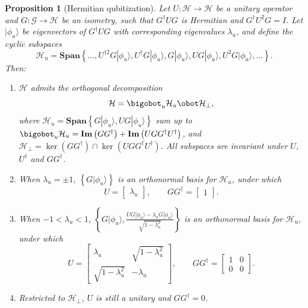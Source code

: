 \documentclass[letterpaper,onecolumn,11pt,accepted=2026-02-14]{quantumarticle}
\newtheorem{proposition}[lemma]{Proposition}
\theoremstyle{remark}
\theoremstyle{plain}
\newcommand{\ket}[1]{|#1\rangle}
\begin{document}
\begin{proposition}[Hermitian qubitization]
\label{prop:qubitization}
Let $U:\mathcal{H}\rightarrow\mathcal{H}$ be a unitary operator and $G:\mathcal{G}\rightarrow\mathcal{H}$ be an isometry, such that $G^\dagger UG$ is Hermitian and $G^\dagger U^2G=I$. Let $\ket{\phi_u}$ be eigenvectors of $G^\dagger UG$ with corresponding eigenvalues $\lambda_u$, and define the cyclic subspaces
\begin{equation}
    \mathcal{H}_u=\mathbf{Span}\left\{\ldots,U^{\dagger2} G\ket{\phi_u},U^\dagger G\ket{\phi_u},G\ket{\phi_u},UG\ket{\phi_u},U^2G\ket{\phi_u},\ldots\right\}.
\end{equation}
Then:
\begin{enumerate}
    \item $\mathcal{H}$ admits the orthogonal decomposition
    \begin{equation}
        \mathcal{H}=\bigobot_{u}\mathcal{H}_u
        \obot\mathcal{H}_\bot,
    \end{equation}
    where $\mathcal{H}_u=\mathbf{Span}\left\{G\ket{\phi_u},UG\ket{\phi_u}\right\}$ sum up to 
    $
    \bigobot_{u}\mathcal{H}_u=\mathbf{Im}\left(GG^\dagger\right)+\mathbf{Im}\left(UGG^\dagger U^\dagger\right)$, and $\mathcal{H}_\bot=\ker\left(GG^\dagger\right)\cap\ker\left(UGG^\dagger U^\dagger\right)$.
    All subspaces are invariant under $U$, $U^\dagger$ and $GG^\dagger$.
    \item When $\lambda_u=\pm1$, $\left\{G\ket{\phi_u}\right\}$ is an orthonormal basis for $\mathcal{H}_u$, under which
    \begin{equation}
        U=\begin{bmatrix}
            \lambda_u
        \end{bmatrix},\qquad
        GG^\dagger=\begin{bmatrix}
            1
        \end{bmatrix}.
    \end{equation}
    \item When $-1<\lambda_u<1$, $\left\{G\ket{\phi_u},\frac{UG\ket{\phi_u}-\lambda_uG\ket{\phi_u}}{\sqrt{1-\lambda_u^2}}\right\}$ is an orthonormal basis for $\mathcal{H}_u$, under which
    \begin{equation}
        U=\begin{bmatrix}
            \lambda_u & \sqrt{1-\lambda_u^2}\\
            \sqrt{1-\lambda_u^2} & -\lambda_u
        \end{bmatrix},\qquad
        GG^\dagger=
        \begin{bmatrix}
            1 & 0\\
            0 & 0
        \end{bmatrix}.
    \end{equation}
    \item Restricted to $\mathcal{H}_\bot$, $U$ is still a unitary and $GG^\dagger=0$.
\end{enumerate}
\end{proposition}
\end{document}
